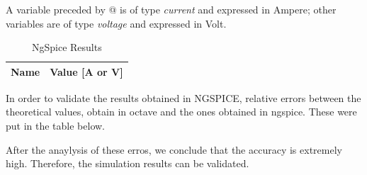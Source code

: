 A variable preceded by @ is of type {\em current} and expressed in Ampere; other variables are of type {\it voltage} and expressed in
    Volt.
\begin{table}[ht]
  \centering
  \begin{tabular}{|l|r|}
    \hline    
    {\bf Name} & {\bf Value [A or V]} \\ \hline
    
  \end{tabular}
  \caption{NgSpice Results}
  \label{tab:op}
\end{table}


In order to validate the results obtained in NGSPICE, relative errors between the theoretical values, obtain in octave and the ones obtained in ngspice. These were put in the table below.






After the anaylysis of these erros, we conclude that the accuracy is extremely high. Therefore, the simulation results can be validated.

